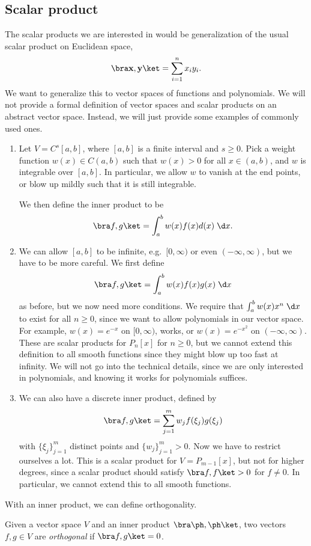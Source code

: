 \documentclass[a4paper]{article}
\begin{document}
\subsection{Scalar product}
The scalar products we are interested in would be generalization of the usual scalar product on Euclidean space,
\[
  \bra \mathbf{x}, \mathbf{y}\ket = \sum_{i = 1}^n x_i y_i.
\]
We want to generalize this to vector spaces of functions and polynomials. We will not provide a formal definition of vector spaces and scalar products on an abstract vector space. Instead, we will just provide some examples of commonly used ones.
\begin{eg}\leavevmode
  \begin{enumerate}
    \item Let $V = C^s[a, b]$, where $[a, b]$ is a finite interval and $s \geq 0$. Pick a weight function $w(x) \in C(a, b)$ such that $w(x) > 0$ for all $x \in (a, b)$, and $w$ is integrable over $[a, b]$. In particular, we allow $w$ to vanish at the end points, or blow up mildly such that it is still integrable.

      We then define the inner product to be
      \[
        \bra f, g\ket = \int_a^b w(x) f(x) d(x)\;\d x.
      \]
    \item We can allow $[a, b]$ to be infinite, e.g.\ $[0, \infty)$ or even $(-\infty, \infty)$, but we have to be more careful. We first define
      \[
        \bra f, g\ket = \int_a^b w(x) f(x) g(x) \;\d x
      \]
      as before, but we now need more conditions. We require that $\int_a^b w(x) x^n\;\d x$ to exist for all $n \geq 0$, since we want to allow polynomials in our vector space. For example, $w(x) = e^{-x}$ on $[0, \infty)$, works, or $w(x) = e^{-x^2}$ on $(-\infty, \infty)$. These are scalar products for $P_n[x]$ for $n \geq 0$, but we cannot extend this definition to all smooth functions since they might blow up too fast at infinity. We will not go into the technical details, since we are only interested in polynomials, and knowing it works for polynomials suffices.
    \item We can also have a discrete inner product, defined by
      \[
        \bra f, g\ket = \sum_{j = 1}^m w_j f(\xi_j) g(\xi_j)
      \]
      with $\{\xi_j\}_{j = 1}^m$ distinct points and $\{w_j\}_{j = 1}^m > 0$. Now we have to restrict ourselves a lot. This is a scalar product for $V = P_{m - 1}[x]$, but not for higher degrees, since a scalar product should satisfy $\bra f, f \ket > 0$ for $f \not= 0$. In particular, we cannot extend this to all smooth functions.
  \end{enumerate}
\end{eg}
With an inner product, we can define orthogonality.
\begin{defi}[Orthogonalilty]
  Given a vector space $V$ and an inner product $\bra \ph, \ph\ket$, two vectors $f, g \in V$ are \emph{orthogonal} if $\bra f, g\ket = 0$.
\end{defi}
\end{document}
